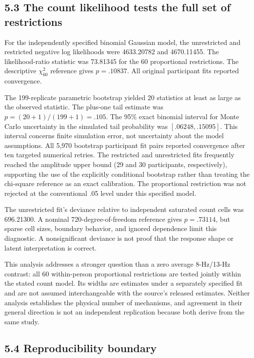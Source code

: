 \documentclass[
  11pt,
]{article}
\let\ctdoldsubsection\subsection
\renewcommand{\subsection}{\Needspace{6\baselineskip}\ctdoldsubsection}
\begin{document}
\hypertarget{the-count-likelihood-tests-the-full-set-of-restrictions}{%
\subsection{5.3 The count likelihood tests the full set of
restrictions}\label{the-count-likelihood-tests-the-full-set-of-restrictions}}

For the independently specified binomial Gaussian model, the
unrestricted and restricted negative log likelihoods were 4633.20782 and
4670.11455. The likelihood-ratio statistic was 73.81345 for the 60
proportional restrictions. The descriptive \(\chi^2_{60}\) reference
gives \(p=.10837\). All original participant fits reported convergence.

The 199-replicate parametric bootstrap yielded 20 statistics at least as
large as the observed statistic. The plus-one tail estimate was
\(p=(20+1)/(199+1)=.105\). The 95\% exact binomial interval for Monte
Carlo uncertainty in the simulated tail probability was
\([.06248,.15095]\). This interval concerns finite simulation error, not
uncertainty about the model assumptions. All 5,970 bootstrap participant
fit pairs reported convergence after ten targeted numerical retries. The
restricted and unrestricted fits frequently reached the amplitude upper
bound (29 and 30 participants, respectively), supporting the use of the
explicitly conditional bootstrap rather than treating the chi-square
reference as an exact calibration. The proportional restriction was not
rejected at the conventional .05 level under this specified model.

The unrestricted fit's deviance relative to independent saturated count
cells was 696.21300. A nominal 720-degree-of-freedom reference gives
\(p=.73114\), but sparse cell sizes, boundary behavior, and ignored
dependence limit this diagnostic. A nonsignificant deviance is not proof
that the response shape or latent interpretation is correct.

This analysis addresses a stronger question than a zero average
8-Hz/13-Hz contrast: all 60 within-person proportional restrictions are
tested jointly within the stated count model. Its widths are estimates
under a separately specified fit and are not assumed interchangeable
with the source's released estimates. Neither analysis establishes the
physical number of mechanisms, and agreement in their general direction
is not an independent replication because both derive from the same
study.

\hypertarget{reproducibility-boundary}{%
\subsection{5.4 Reproducibility
boundary}\label{reproducibility-boundary}}
\end{document}
